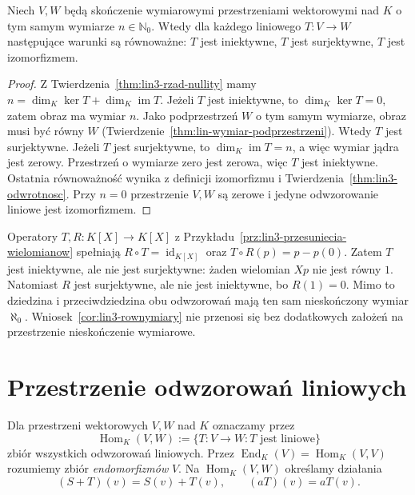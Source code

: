 \begin{wniosek}
\label{cor:lin3-rownymiary}
Niech \(V,W\) będą skończenie wymiarowymi
przestrzeniami wektorowymi nad \(K\)
o tym samym wymiarze \(n\in\mathbb N_0\).
Wtedy dla każdego liniowego \(T\colon V\to W\)
następujące warunki są równoważne:
\(T\) jest iniektywne, \(T\) jest surjektywne,
\(T\) jest izomorfizmem.
\end{wniosek}
\begin{proof}
Z Twierdzenia~\ref{thm:lin3-rzad-nullity}
mamy \(n=\dim_K\ker T+\dim_K\operatorname{im}T\).
Jeżeli \(T\) jest iniektywne, to
\(\dim_K\ker T=0\), zatem obraz ma wymiar \(n\).
Jako podprzestrzeń \(W\) o tym samym wymiarze,
obraz musi być równy \(W\)
(Twierdzenie~\ref{thm:lin-wymiar-podprzestrzeni}).
Wtedy \(T\) jest surjektywne.
Jeżeli \(T\) jest surjektywne, to
\(\dim_K\operatorname{im}T=n\),
a więc wymiar jądra jest zerowy.
Przestrzeń o wymiarze zero jest zerowa,
więc \(T\) jest iniektywne.
Ostatnia równoważność wynika z definicji
izomorfizmu i Twierdzenia~\ref{thm:lin3-odwrotnosc}.
Przy \(n=0\) przestrzenie \(V,W\) są zerowe
i jedyne odwzorowanie liniowe jest izomorfizmem.
\end{proof}

\begin{przyklad}
\label{prz:lin3-infty-nie-rownowazne}
Operatory \(T,R\colon K[X]\to K[X]\)
z Przykładu~\ref{prz:lin3-przesuniecia-wielomianow}
spełniają \(R\circ T=\operatorname{id}_{K[X]}\)
oraz \(T\circ R(p)=p-p(0)\).
Zatem \(T\) jest iniektywne, ale nie jest
surjektywne: żaden wielomian \(Xp\)
nie jest równy \(1\).
Natomiast \(R\) jest surjektywne,
ale nie jest iniektywne, bo \(R(1)=0\).
Mimo to dziedzina i przeciwdziedzina
obu odwzorowań mają ten sam nieskończony wymiar
\(\aleph_0\). Wniosek~\ref{cor:lin3-rownymiary}
nie przenosi się bez dodatkowych założeń
na przestrzenie nieskończenie wymiarowe.
\end{przyklad}

\section{Przestrzenie odwzorowań liniowych}
\label{sec:lin3-hom}

\begin{definicja}
\label{def:lin3-hom-end}
Dla przestrzeni wektorowych \(V,W\) nad \(K\)
oznaczamy przez
\[
 \operatorname{Hom}_K(V,W)
  :=\{T\colon V\to W:T\text{ jest liniowe}\}
\]
zbiór wszystkich odwzorowań liniowych.
Przez \(\operatorname{End}_K(V)=\operatorname{Hom}_K(V,V)\)
rozumiemy zbiór \emph{endomorfizmów} \(V\).
Na \(\operatorname{Hom}_K(V,W)\) określamy działania
\[
 (S+T)(v)=S(v)+T(v),\qquad
 (aT)(v)=aT(v).
\]
\end{definicja}


